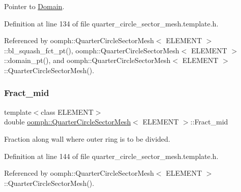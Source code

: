 Pointer to \hyperlink{classoomph_1_1Domain}{Domain}. 



Definition at line 134 of file quarter\+\_\+circle\+\_\+sector\+\_\+mesh.\+template.\+h.



Referenced by oomph\+::\+Quarter\+Circle\+Sector\+Mesh$<$ E\+L\+E\+M\+E\+N\+T $>$\+::bl\+\_\+squash\+\_\+fct\+\_\+pt(), oomph\+::\+Quarter\+Circle\+Sector\+Mesh$<$ E\+L\+E\+M\+E\+N\+T $>$\+::domain\+\_\+pt(), and oomph\+::\+Quarter\+Circle\+Sector\+Mesh$<$ E\+L\+E\+M\+E\+N\+T $>$\+::\+Quarter\+Circle\+Sector\+Mesh().

\mbox{\label{classoomph_1_1QuarterCircleSectorMesh_a149224b002f785eb357553f8210ad5d3}} 
\subsubsection{\texorpdfstring{Fract\+\_\+mid}{Fract\_mid}}
{\footnotesize\ttfamily template$<$class E\+L\+E\+M\+E\+NT$>$ \\
double \hyperlink{classoomph_1_1QuarterCircleSectorMesh}{oomph\+::\+Quarter\+Circle\+Sector\+Mesh}$<$ E\+L\+E\+M\+E\+NT $>$\+::Fract\+\_\+mid\hspace{0.3cm}{\ttfamily [protected]}}



Fraction along wall where outer ring is to be divided. 



Definition at line 144 of file quarter\+\_\+circle\+\_\+sector\+\_\+mesh.\+template.\+h.



Referenced by oomph\+::\+Quarter\+Circle\+Sector\+Mesh$<$ E\+L\+E\+M\+E\+N\+T $>$\+::\+Quarter\+Circle\+Sector\+Mesh().

\mbox{\label{classoomph_1_1QuarterCircleSectorMesh_a2cbdec5f0ee2f370c38f1fdc4e2904f8}} 
